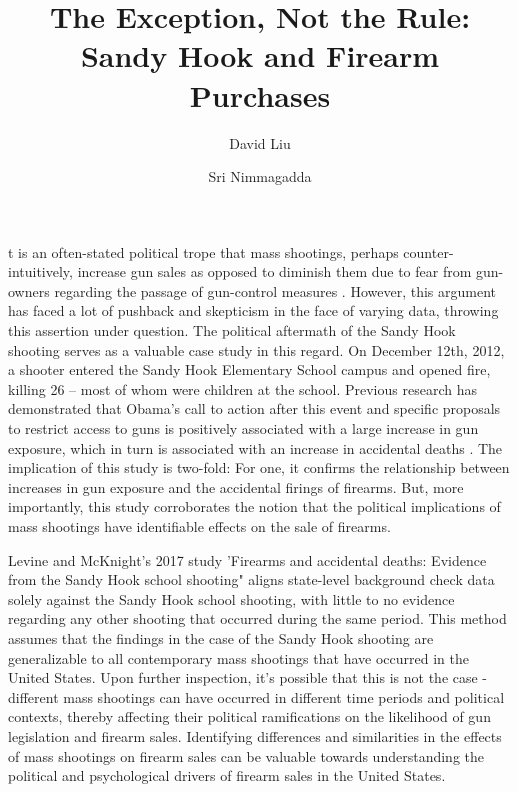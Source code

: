\documentclass[9pt,twocolumn,twoside,lineno]{pnas-new}
\title{The Exception, Not the Rule: Sandy Hook and Firearm Purchases}
\author[a,1]{David Liu}
\author[b,1]{Sri Nimmagadda}
\affil[a]{Princeton University, Department of Computer Science}
\affil[b]{Princeton University, Woodrow Wilson School of Public and International Affairs}
\begin{document}
\maketitle
\thispagestyle{firststyle}

t is an often-stated political trope that mass shootings, perhaps counter-intuitively, increase gun sales as opposed to diminish them due to fear from gun-owners regarding the passage of gun-control measures \cite{pinsker_why_2017}. However, this argument has faced a lot of pushback and skepticism in the face of varying data, throwing this assertion under question. The political aftermath of the Sandy Hook shooting serves as a valuable case study in this regard. On December 12th, 2012, a shooter entered the Sandy Hook Elementary School campus and opened fire, killing 26 – most of whom were children at the school. Previous research has demonstrated that Obama’s call to action after this event and specific proposals to restrict access to guns is positively associated with a large increase in gun exposure, which in turn is associated with an increase in accidental deaths \cite{levine_firearms_2017}. The implication of this study is two-fold: For one, it confirms the relationship between increases in gun exposure and the accidental firings of firearms. But, more importantly, this study corroborates the notion that the political implications of mass shootings have identifiable effects on the sale of firearms.

Levine and McKnight's 2017 study 'Firearms and accidental deaths: Evidence from the Sandy Hook school shooting" aligns state-level background check data solely against the Sandy Hook school shooting, with little to no evidence regarding any other shooting that occurred during the same period. This method assumes that the findings in the case of the Sandy Hook shooting are generalizable to all contemporary mass shootings that have occurred in the United States. Upon further inspection, it's possible that this is not the case - different mass shootings can have occurred in different time periods and political contexts, thereby affecting their political ramifications on the likelihood of gun legislation and firearm sales. Identifying differences and similarities in the effects of mass shootings on firearm sales can be valuable towards understanding the political and psychological drivers of firearm sales in the United States.
\end{document}
